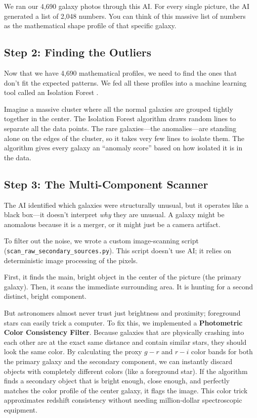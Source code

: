 \documentclass[twocolumn]{aastex631}
\begin{document}
We ran our 4,690 galaxy photos through this AI. For every single picture, the AI generated a list of 2,048 numbers. You can think of this massive list of numbers as the mathematical shape profile of that specific galaxy. 

\subsection{Step 2: Finding the Outliers}
Now that we have 4,690 mathematical profiles, we need to find the ones that don't fit the expected patterns. We fed all these profiles into a machine learning tool called an Isolation Forest \citep{liu2008}. 

Imagine a massive cluster where all the normal galaxies are grouped tightly together in the center. The Isolation Forest algorithm draws random lines to separate all the data points. The rare galaxies—the anomalies—are standing alone on the edges of the cluster, so it takes very few lines to isolate them. The algorithm gives every galaxy an ``anomaly score'' based on how isolated it is in the data.

\subsection{Step 3: The Multi-Component Scanner}
The AI identified which galaxies were structurally unusual, but it operates like a black box—it doesn't interpret \textit{why} they are unusual. A galaxy might be anomalous because it is a merger, or it might just be a camera artifact.

To filter out the noise, we wrote a custom image-scanning script (\texttt{scan\_raw\_secondary\_sources.py}). This script doesn't use AI; it relies on deterministic image processing of the pixels. 

First, it finds the main, bright object in the center of the picture (the primary galaxy). Then, it scans the immediate surrounding area. It is hunting for a second distinct, bright component. 

But astronomers almost never trust just brightness and proximity; foreground stars can easily trick a computer. To fix this, we implemented a \textbf{Photometric Color Consistency Filter}. Because galaxies that are physically crashing into each other are at the exact same distance and contain similar stars, they should look the same color. By calculating the proxy $g-r$ and $r-i$ color bands for both the primary galaxy and the secondary component, we can instantly discard objects with completely different colors (like a foreground star). If the algorithm finds a secondary object that is bright enough, close enough, and perfectly matches the color profile of the center galaxy, it flags the image. This color trick approximates redshift consistency without needing million-dollar spectroscopic equipment.
\end{document}
